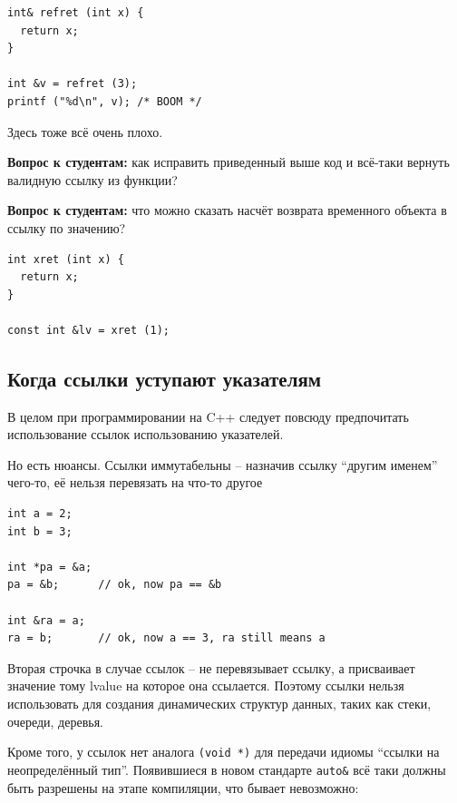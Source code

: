 \documentclass[a4paper,12pt,oneside]{book}
\newif\ifanswers
\begin{document}
\begin{lstlisting}
int& refret (int x) {
  return x;
}

int &v = refret (3);
printf ("%d\n", v); /* BOOM */
\end{lstlisting}

Здесь тоже всё очень плохо.

\textbf{Вопрос к студентам:} как исправить приведенный выше код и всё-таки вернуть валидную ссылку из функции?

\ifanswers
Ответов может быть много: статические переменные, динамическая аллокация, глобалы, выберите ваш вариант
\fi

\textbf{Вопрос к студентам:} что можно сказать насчёт возврата временного объекта в ссылку по значению?

\begin{lstlisting}
int xret (int x) {
  return x;
}

const int &lv = xret (1);
\end{lstlisting}

\ifanswers
Правильный ответ: тут всё нормально, работает обсуждавшееся выше расширение срока жизни.
\fi

\subsection{Когда ссылки уступают указателям}\label{PointersVsRefs}

В целом при программировании на C++ следует повсюду предпочитать использование ссылок использованию указателей.

Но есть нюансы. Ссылки иммутабельны -- назначив ссылку ``другим именем'' чего-то, её нельзя перевязать на что-то другое

\begin{lstlisting}
int a = 2;
int b = 3;

int *pa = &a;
pa = &b;      // ok, now pa == &b

int &ra = a;
ra = b;       // ok, now a == 3, ra still means a
\end{lstlisting}

Вторая строчка в случае ссылок -- не перевязывает ссылку, а присваивает значение тому lvalue на которое она ссылается. Поэтому ссылки нельзя использовать для создания динамических структур данных, таких как стеки, очереди, деревья.

Кроме того, у ссылок нет аналога \lstinline!(void *)! для передачи идиомы ``ссылки на неопределённый тип''. Появившиеся в новом стандарте \lstinline!auto&! всё таки должны быть разрешены на этапе компиляции, что бывает невозможно:
\end{document}

